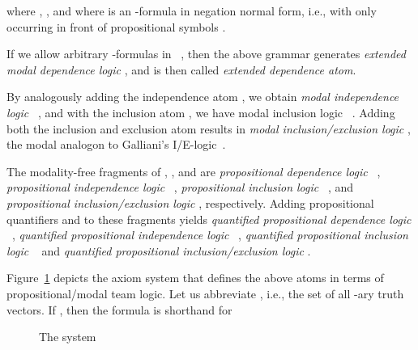 \documentclass[a4paper,english,fleqn,11pt,final]{scrartcl}
\makeatletter
\newcommand{\ie}{i.e.\@\xspace}
\newcommand{\Deriv}[1]{{\normalfont\textsf{#1}}}
\theoremstyle{plain}
\theoremstyle{definition}
\makeatother
\begin{document}
where , , and where  is an -formula in negation normal form, \ie, with  only occurring in front of propositional symbols .

If we allow arbitrary -formulas in ~\cite{emdl}, then the above grammar generates \emph{extended modal dependence logic}  \cite{emdl}, and  is then called \emph{extended dependence atom}.

By analogously adding the independence atom , we obtain \emph{modal independence logic} ~\cite{mind}, and with
the inclusion atom , we have modal inclusion logic ~\cite{HellaS15}.
Adding both the inclusion and exclusion atom results in \emph{modal inclusion/exclusion logic} , the modal analogon to Galliani's I/E-logic~\cite{galliani_inclusion_2012}.



\smallskip

The modality-free fragments of , ,  and  are \emph{propositional dependence logic} ~\cite{yang_propositional_2016},
\emph{propositional independence logic} ~\cite{hannula_complexity_2015},
\emph{propositional inclusion logic} ~\cite{hannula_complexity_2015}, and
\emph{propositional inclusion/exclusion logic} , respectively.
Adding propositional quantifiers  and  to these fragments yields \emph{quantified propositional dependence logic} ~\cite{gandalf},
\emph{quantified propositional independence logic} ~\cite{gandalf},
\emph{quantified propositional inclusion logic} ~\cite{gandalf} and
\emph{quantified propositional inclusion/exclusion logic} .



Figure~\ref{fig:dep-atoms} depicts the axiom system  that defines the above atoms in terms of propositional/modal team logic.
Let us abbreviate , \ie, the set of all -ary truth vectors. If , then the formula  is shorthand for


\begin{figure}[t]
\centering
\scalebox{0.95}{
\begin{tabular}{rlc}
\toprule
& \quad   & \Deriv{(D1)}\\
& \quad  & \Deriv{(D2)}\vspace{10pt}\\
& \quad & \Deriv{(Ind1)}\\
&&\Deriv{(Ind2)}\vspace{10pt}\\
& \quad & \Deriv{(Inc)}\vspace{10pt}\\
& \quad & \Deriv{(Exc)}\vspace{10pt}\\
\bottomrule
\end{tabular}}
\caption{The system \label{fig:dep-atoms}}
\end{figure}
\end{document}

